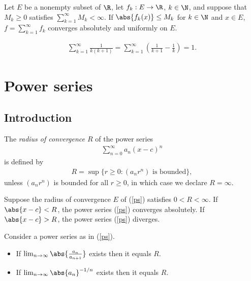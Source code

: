 \documentclass{article}
\begin{document}
\begin{theorem}
	Let $E$ be a nonempty subset of $\R$, let $f_k:E\to\R$, $k\in\N$, and suppose that $M_k\geq 0$
	satisfies $\sum_{k=1}^\infty M_k<\infty$. If $\abs{f_k(x)}\leq M_k$ for $k\in\N$ and $x\in E$,
	$f=\sum_{k=1}^\infty f_k$ converges absolutely and uniformly on $E$.
\end{theorem}

\begin{lemma*}
	\begin{align*}
		\sum_{k=1}^\infty \frac{1}{k(k+1)} = \sum_{k=1}^\infty \left(\frac{1}{k+1}-\frac{1}{k}\right)=1.
	\end{align*}
\end{lemma*}

\section{Power series}

\subsection{Introduction}

\begin{definition}
	The \emph{radius of convergence $R$} of the power series
	\begin{align}
		\label{ps}
		\sum_{n=0}^\infty a_n(x-c)^n
	\end{align}
	is defined by
	\begin{align*}
		R = \sup\{r\geq 0:(a_nr^n) \text{ is bounded}\},
	\end{align*}
	unless $(a_nr^n)$ is bounded for all $r\geq 0$, in which case we declare $R=\infty$.
\end{definition}

\begin{theorem}[Notes 3.1]
	Suppose the radius of convergence $E$ of (\ref{ps}) satisfies $0<R<\infty$.
	If $\abs{x-c}<R$, the power series (\ref{ps}) converges absolutely. If
	$\abs{x-c}>R$, the power series (\ref{ps}) diverges.
\end{theorem}

\begin{lemma}[Example 2.2]
	Consider a power series as in (\ref{ps}).
	\begin{itemize}
		\item If $\lim_{n\to\infty}\abs{\frac{a_n}{a_{n+1}}}$ exists then it equals $R$.
		\item If $\lim_{n\to\infty}\abs{a_n}^{-1/n}$ exists then it equals $R$.
	\end{itemize}
\end{lemma}
\end{document}

